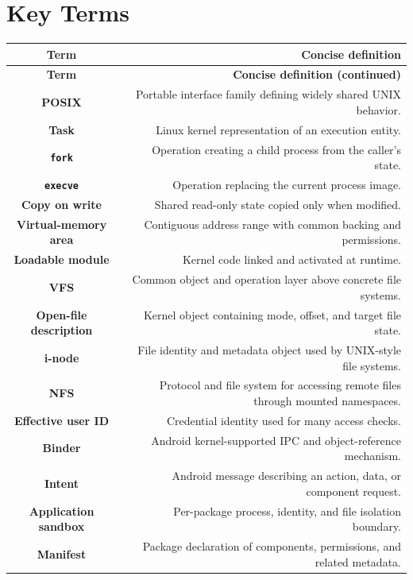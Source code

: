 \documentclass[10pt,letterpaper]{article}
\begin{document}
\section*{Key Terms}
\small
\begin{longtable}{C N}
\color{white}\textbf{Term} & \color{white}\textbf{Concise definition}\\
\endfirsthead
{}\color{white}\textbf{Term} & \color{white}\textbf{Concise definition (continued)}\\
\endhead
\textbf{POSIX} & Portable interface family defining widely shared UNIX behavior.\\\hline
\textbf{Task} & Linux kernel representation of an execution entity.\\\hline
\textbf{\texttt{fork}} & Operation creating a child process from the caller's state.\\\hline
\textbf{\texttt{execve}} & Operation replacing the current process image.\\\hline
\textbf{Copy on write} & Shared read-only state copied only when modified.\\\hline
\textbf{Virtual-memory area} & Contiguous address range with common backing and permissions.\\\hline
\textbf{Loadable module} & Kernel code linked and activated at runtime.\\\hline
\textbf{VFS} & Common object and operation layer above concrete file systems.\\\hline
\textbf{Open-file description} & Kernel object containing mode, offset, and target file state.\\\hline
\textbf{i-node} & File identity and metadata object used by UNIX-style file systems.\\\hline
\textbf{NFS} & Protocol and file system for accessing remote files through mounted namespaces.\\\hline
\textbf{Effective user ID} & Credential identity used for many access checks.\\\hline
\textbf{Binder} & Android kernel-supported IPC and object-reference mechanism.\\\hline
\textbf{Intent} & Android message describing an action, data, or component request.\\\hline
\textbf{Application sandbox} & Per-package process, identity, and file isolation boundary.\\\hline
\textbf{Manifest} & Package declaration of components, permissions, and related metadata.\\\hline
\end{longtable}
\normalsize
\end{document}
